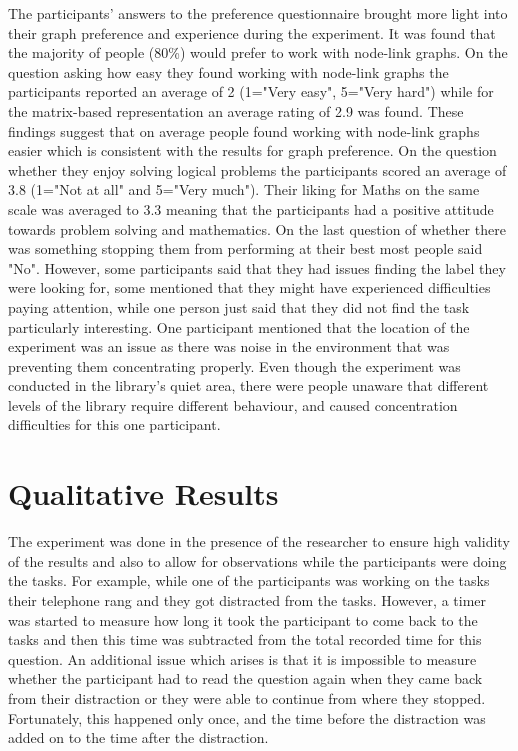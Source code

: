 \documentclass{l4proj}
\begin{document}
The participants' answers to the preference questionnaire brought more light into their graph preference and experience during the experiment. It was found that the majority of people (80\%) would prefer to work with node-link graphs. On the question asking how easy they found working with node-link graphs the participants reported an average of 2 (1="Very easy", 5="Very hard") while for the matrix-based representation an average rating of 2.9 was found. These findings suggest that on average people found working with node-link graphs easier which is consistent with the results for graph preference. On the question whether they enjoy solving logical problems the participants scored an average of 3.8 (1="Not at all" and 5="Very much"). Their liking for Maths on the same scale was averaged to 3.3 meaning that the participants had a positive attitude towards problem solving and mathematics. On the last question of whether there was something stopping them from performing at their best most people said "No". However, some participants said that they had issues finding the label they were looking for, some mentioned that they might have experienced difficulties paying attention, while one person just said that they did not find the task particularly interesting. One participant mentioned that the location of the experiment was an issue as there was noise in the environment that was preventing them concentrating properly. Even though the experiment was conducted in the library's quiet area, there were people unaware that different levels of the library require different behaviour, and caused concentration difficulties for this one participant.


\section{Qualitative Results}

The experiment was done in the presence of the researcher to ensure high validity of the results and also to allow for  observations while the participants were doing the tasks. For example, while one of the participants was working on the tasks their telephone rang and they got distracted from the tasks. However, a timer was started to measure how long it took the participant to come back to the tasks and then this time was subtracted from the total recorded time for this question. An additional issue which arises is that it is impossible to measure whether the participant had to read the question again when they came back from their distraction or they were able to continue from where they stopped. Fortunately, this happened only once, and the time before the distraction was added on to the time after the distraction.
\end{document}
